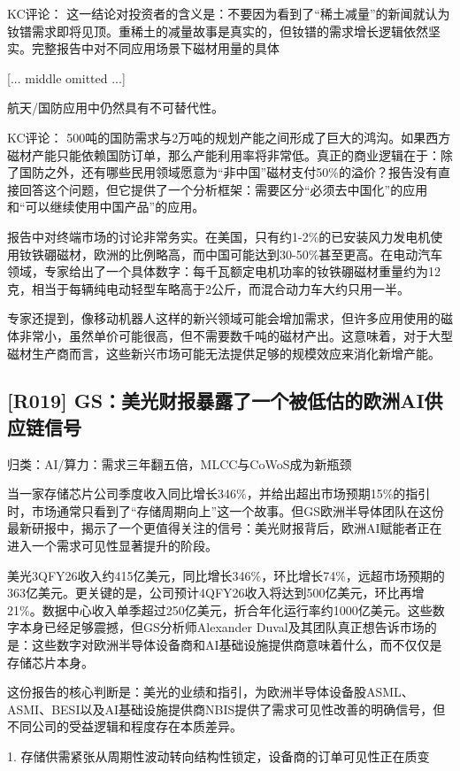 \documentclass[11pt]{ctexart}
\begin{document}
KC评论： 这一结论对投资者的含义是：不要因为看到了“稀土减量”的新闻就认为钕镨需求即将见顶。重稀土的减量故事是真实的，但钕镨的需求增长逻辑依然坚实。完整报告中对不同应用场景下磁材用量的具体

[... middle omitted ...]

航天/国防应用中仍然具有不可替代性。

KC评论： 500吨的国防需求与2万吨的规划产能之间形成了巨大的鸿沟。如果西方磁材产能只能依赖国防订单，那么产能利用率将非常低。真正的商业逻辑在于：除了国防之外，还有哪些民用领域愿意为“非中国”磁材支付50\%的溢价？报告没有直接回答这个问题，但它提供了一个分析框架：需要区分“必须去中国化”的应用和“可以继续使用中国产品”的应用。

报告中对终端市场的讨论非常务实。在美国，只有约1-2\%的已安装风力发电机使用钕铁硼磁材，欧洲的比例略高，而中国可能达到30-50\%甚至更高。在电动汽车领域，专家给出了一个具体数字：每千瓦额定电机功率的钕铁硼磁材重量约为12克，相当于每辆纯电动轻型车略高于2公斤，而混合动力车大约只用一半。

专家还提到，像移动机器人这样的新兴领域可能会增加需求，但许多应用使用的磁体非常小，虽然单价可能很高，但不需要数千吨的磁材产出。这意味着，对于大型磁材生产商而言，这些新兴市场可能无法提供足够的规模效应来消化新增产能。

\subsection{[R019] GS：美光财报暴露了一个被低估的欧洲AI供应链信号}
{\small\color{refgray}归类：AI/算力：需求三年翻五倍，MLCC与CoWoS成为新瓶颈}

当一家存储芯片公司季度收入同比增长346\%，并给出超出市场预期15\%的指引时，市场通常只看到了“存储周期向上”这一个故事。但GS欧洲半导体团队在这份最新研报中，揭示了一个更值得关注的信号：美光财报背后，欧洲AI赋能者正在进入一个需求可见性显著提升的阶段。

美光3QFY26收入约415亿美元，同比增长346\%，环比增长74\%，远超市场预期的363亿美元。更关键的是，公司预计4QFY26收入将达到500亿美元，环比再增21\%。数据中心收入单季超过250亿美元，折合年化运行率约1000亿美元。这些数字本身已经足够震撼，但GS分析师Alexander Duval及其团队真正想告诉市场的是：这些数字对欧洲半导体设备商和AI基础设施提供商意味着什么，而不仅仅是存储芯片本身。

这份报告的核心判断是：美光的业绩和指引，为欧洲半导体设备股ASML、ASMI、BESI以及AI基础设施提供商NBIS提供了需求可见性改善的明确信号，但不同公司的受益逻辑和程度存在本质差异。

1. 存储供需紧张从周期性波动转向结构性锁定，设备商的订单可见性正在质变
\end{document}
